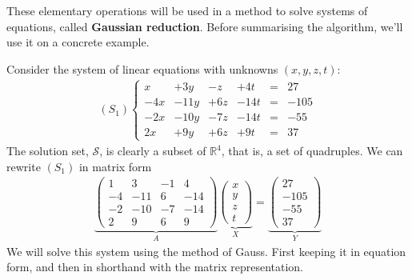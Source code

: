 \documentclass[usenames,dvipsnames,aspectratio=169,10pt]{beamer}
\numberwithin{equation}{section}
\begin{document}
\begin{frame}
\centering
\begin{minipage}{0.75\textwidth}
These elementary operations will be used in a method to solve systems of equations, called \textbf{Gaussian reduction}. Before summarising the algorithm, we'll use it on a concrete example.
\end{minipage}

\end{frame}



\begin{frame}

Consider the system of linear equations with unknowns $(x,y,z,t)$:
\begin{align*}
(S_1)
\left\{
\begin{matrix}
    x &+  3y &-  z &+  4t &=&   27 \\
  -4x &- 11y &+ 6z &- 14t &=& -105 \\
  -2x &- 10y &- 7z &- 14t &=&  -55 \\
   2x &+  9y &+ 6z &+  9t &=&   37
\end{matrix}
\right.
\end{align*}
The solution set, $\mathcal{S}$, is clearly a subset of $\mathbb{R}^4$, that is, a set of quadruples. We can rewrite $(S_1)$ in matrix form
\begin{align*}
\underbrace{
\begin{pmatrix}
   1 &   3 & -1 &   4 \\
  -4 & -11 &  6 & -14 \\
  -2 & -10 & -7 & -14 \\
   2 &   9 &  6 &   9
\end{pmatrix}}_A
\underbrace{
\begin{pmatrix}
x \\
y \\
z \\
t
\end{pmatrix}}_X
=
\underbrace{
\begin{pmatrix}
27 \\
-105 \\
-55 \\
37
\end{pmatrix}}_Y
\end{align*}
We will solve this system using the method of Gauss. First keeping it in equation form, and then in shorthand with the matrix representation.
\end{frame}
\end{document}
